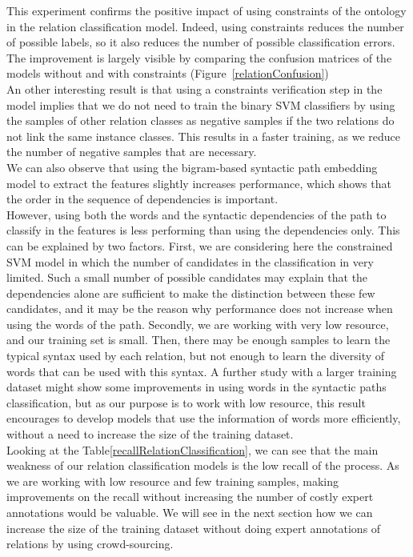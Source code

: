 \documentclass[twocolumn]{article}
\begin{document}
This experiment confirms the positive impact of using constraints of the ontology in the relation classification model. Indeed, using constraints reduces the number of possible labels, so it also reduces the number of possible classification errors. The improvement is largely visible by comparing the confusion matrices of the models without and with constraints (Figure~\ref{relationConfusion})\\
An other interesting result is that using a constraints verification step in the model implies that we do not need to train the binary SVM classifiers by using the samples of other relation classes as negative samples if the two relations do not link the same instance classes. This results in a faster training, as we reduce the number of negative samples that are necessary.\\
We can also observe that using the bigram-based syntactic path embedding model to extract the features slightly increases performance, which shows that the order in the sequence of dependencies is important.\\
However, using both the words and the syntactic dependencies of the path to classify in the features is less performing than using the dependencies only. This can be explained by two factors. First, we are considering here the constrained SVM model in which the number of candidates in the classification in very limited. Such a small number of possible candidates may explain that the dependencies alone are sufficient to make the distinction between these few candidates, and it may be the reason why performance does not increase when using the words of the path. Secondly, we are working with very low resource, and our training set is small. Then, there may be enough samples to learn the typical syntax used by each relation, but not enough to learn the diversity of words that can be used with this syntax. A further study with a larger training dataset might show some improvements in using words in the syntactic paths classification, but as our purpose is to work with low resource, this result encourages to develop models that use the information of words more efficiently, without a need to increase the size of the training dataset.\\
Looking at the Table\ref{recallRelationClassification}, we can see that the main weakness of our relation classification models is the low recall of the process. As we are working with low resource and few training samples, making improvements on the recall without increasing the number of costly expert annotations would be valuable. We will see in the next section how we can increase the size of the training dataset without doing expert annotations of relations by using crowd-sourcing.\\
\end{document}
